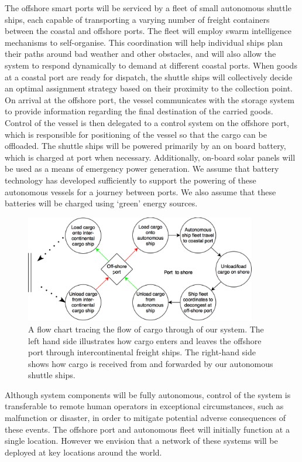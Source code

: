 The offshore smart ports will be serviced by a fleet of small autonomous shuttle ships, each capable of transporting a varying number of freight containers between the coastal and offshore ports. The fleet will employ swarm intelligence mechanisms to self-organise. This coordination will help individual ships plan their paths around bad weather and other obstacles, and will also allow the system to respond dynamically to demand at different coastal ports. When goods at a coastal port are ready for dispatch, the shuttle ships will collectively decide an optimal assignment strategy based on their proximity to the collection point. On arrival at the offshore port, the vessel communicates with the storage system to provide information regarding the final destination of the carried goods. Control of the vessel is then delegated to a control system on the offshore port, which is responsible for positioning of the vessel so that the cargo can be offloaded. The shuttle ships will be powered primarily by an on board battery, which is charged at port when necessary. Additionally, on-board solar panels will be used as a means of emergency power generation. We assume that battery technology has developed sufficiently to support the powering of these autonomous vessels for a journey between ports. We also assume that these batteries will be charged using `green’ energy sources.

\begin{figure}[h!]
\begin{center}
\vspace{0.75cm}
\includegraphics[width=0.9\textwidth]{images/flow.png}	
\end{center}
\caption{A flow chart tracing the flow of cargo through of our system. The left hand side illustrates how cargo enters and leaves the offshore port through intercontinental freight ships. The right-hand side shows how cargo is received from and forwarded by our autonomous shuttle ships. }
\label{flow}	
\end{figure}

Although system components will be fully autonomous, control of the system is transferable to remote human operators in exceptional circumstances, such as malfunction or disaster, in order to mitigate potential adverse consequences of these events. The offshore port and autonomous fleet will initially function at a single location. However we envision that a network of these systems will be deployed at key locations around the world.